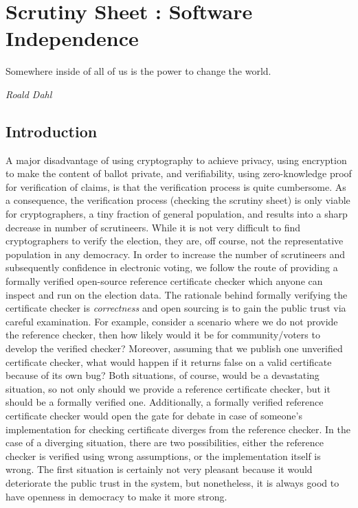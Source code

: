 \chapter{Scrutiny Sheet : Software Independence}
\label{cha:software_independence}
\setlength{\parindent}{2em}

\epigraph{Somewhere inside of all of us is the power to change the world.} 
{\textit{Roald Dahl }}

\section{Introduction}


A major disadvantage of using cryptography 
to achieve privacy,  using encryption to make the 
content of ballot private, and verifiability, using zero-knowledge proof for verification of claims,
is that the verification process  is quite cumbersome. As a consequence, the verification process 
(checking the scrutiny sheet) is only viable for
cryptographers,  a tiny fraction of general population,  and results into 
a sharp decrease in number of scrutineers. 
While it is not very difficult to find cryptographers to verify the election, 
they are, off course, not the representative population in any democracy. 
In order to increase the number of scrutineers and subsequently confidence in electronic voting, we follow the 
route of providing a formally verified open-source 
reference certificate checker which anyone can inspect and run on the election data. 
  The rationale behind formally verifying the certificate checker is \emph{correctness}
  and open sourcing is to gain the public trust  via careful examination.  
  For example, consider a scenario where we do not provide the reference checker,
  then how 
  likely would it be for community/voters to develop the 
  verified checker? Moreover, assuming that we publish one unverified certificate checker,
  what would happen if it returns false on a valid certificate because of its own bug? 
  Both situations, of course, would be a devastating situation, so not only 
  should we provide a reference certificate checker, but it should be a formally verified one. 
  Additionally, a formally verified reference certificate checker would open the gate for
  debate in case of someone's implementation for checking certificate diverges from the reference checker.
In the case of a diverging situation, there are two possibilities, either the reference checker is verified 
using wrong assumptions,  or the implementation itself is wrong.  The first situation is certainly 
not very pleasant because it would deteriorate the public trust in the system, but nonetheless, it is always
good to  have openness in democracy to make it more strong. 
 


